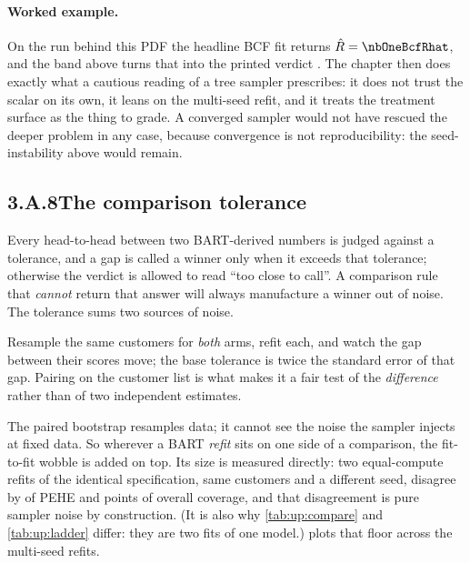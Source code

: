 \paragraph{Worked example.} On the run behind this PDF the headline BCF fit returns
$\hat R = \nbOneBcfRhat$, and the band above turns that into the printed verdict
\textbf{\nbOneBcfRhatVerdict}. The chapter then does exactly what a cautious reading of a tree
sampler prescribes: it does not trust the scalar on its own, it leans on the multi-seed refit, and
it treats the treatment surface as the thing to grade. A converged sampler would not have rescued
the deeper problem in any case, because convergence is not reproducibility: the seed-instability
above would remain.

\subsection*{3.A.8\quad The comparison tolerance}

Every head-to-head between two BART-derived numbers is judged against a tolerance, and a gap is
called a winner only when it exceeds that tolerance; otherwise the verdict is allowed to read
``too close to call''. A comparison rule that \emph{cannot} return that answer will always
manufacture a winner out of noise. The tolerance sums two sources of noise.

\begin{description}[leftmargin=*, style=nextline]
  \item[The paired bootstrap.] Resample the same customers for \emph{both} arms, refit each, and
        watch the gap between their scores move; the base tolerance is twice the standard error of
        that gap. Pairing on the customer list is what makes it a fair test of the \emph{difference}
        rather than of two independent estimates.
  \item[The sampler wobble.] The paired bootstrap resamples data; it cannot see the noise the
         sampler injects at fixed data. So wherever a BART \emph{refit} sits on one
        side of a comparison, the fit-to-fit wobble is added on top. Its size is measured directly:
        two equal-compute refits of the identical specification, same customers and a different seed,
        disagree by \eur{\nbOneBcfSeedPeheWobble} of PEHE and \nbOneBcfSeedCovWobble{} points of
        overall coverage, and that disagreement is pure sampler noise by construction. (It is also
        why \cref{tab:up:compare} and \cref{tab:up:ladder} differ: they are two fits of one model.)
         plots that floor across the multi-seed refits.
\end{description}

